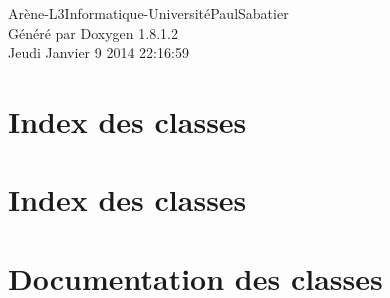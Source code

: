 \documentclass{book}
\begin{document}
\hypersetup{pageanchor=false,citecolor=blue}
\begin{titlepage}
\vspace*{7cm}
\begin{center}
{\Large Arène-\/\-L3\-Informatique-\/\-Université\-Paul\-Sabatier }\\
\vspace*{1cm}
{\large Généré par Doxygen 1.8.1.2}\\
\vspace*{0.5cm}
{\small Jeudi Janvier 9 2014 22:16:59}\\
\end{center}
\end{titlepage}
\clearemptydoublepage
{}
\tableofcontents
\clearemptydoublepage
{}
\hypersetup{pageanchor=true,citecolor=blue}
\chapter{Index des classes}

\chapter{Index des classes}

\chapter{Documentation des classes}









































\printindex
\end{document}
